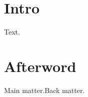 \documentclass{svmono}
\begin{document}
\mainmatter
\chapter{Intro}
Text.
\backmatter
\chapter{Afterword}
\if@mainmatter Main matter.\else Back matter.\fi
\end{document}
